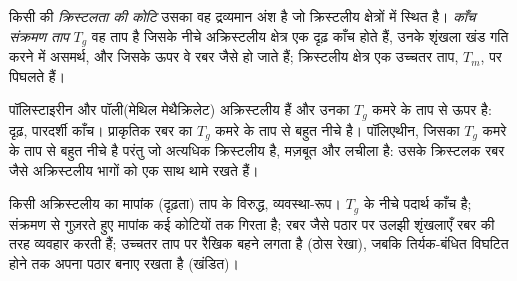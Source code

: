 \begin{definition}[ऊष्मीय संक्रमण]\label{def:b2:polymer-synthesis:transitions}
किसी  की \emph{क्रिस्टलता की कोटि} उसका वह द्रव्यमान अंश है
जो क्रिस्टलीय क्षेत्रों में स्थित है। \emph{काँच संक्रमण ताप}
$T_g$ वह ताप है जिसके नीचे अक्रिस्टलीय क्षेत्र एक दृढ़ काँच होते हैं, उनके शृंखला
खंड गति करने में असमर्थ, और जिसके ऊपर वे रबर जैसे हो जाते हैं; क्रिस्टलीय क्षेत्र एक उच्चतर
ताप, $T_m$, पर पिघलते हैं।
\end{definition}

पॉलिस्टाइरीन और पॉली(मेथिल मेथैक्रिलेट) अक्रिस्टलीय हैं और उनका $T_g$ कमरे के ताप से ऊपर है: दृढ़,
पारदर्शी काँच। प्राकृतिक रबर का $T_g$ कमरे के ताप से बहुत नीचे है। पॉलिएथीन, जिसका $T_g$ कमरे के ताप से
बहुत नीचे है परंतु जो अत्यधिक क्रिस्टलीय है, मज़बूत और लचीला है: उसके क्रिस्टलक रबर जैसे
अक्रिस्टलीय भागों को एक साथ थामे रखते हैं।

\begin{omfigure}
\par\vspace{4pt}

{\small किसी अक्रिस्टलीय  का मापांक (दृढ़ता) ताप के विरुद्ध, व्यवस्था-रूप। $T_g$ के नीचे
पदार्थ काँच है; संक्रमण से गुज़रते हुए मापांक कई कोटियों तक गिरता है; रबर जैसे
पठार पर उलझी शृंखलाएँ रबर की तरह व्यवहार करती हैं; उच्चतर ताप पर रैखिक  बहने लगता है (ठोस
रेखा), जबकि तिर्यक-बंधित  विघटित होने तक अपना पठार बनाए रखता है (खंडित)।}
\end{omfigure}

